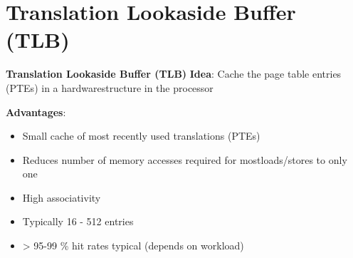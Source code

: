 \documentclass[11pt, table, aspectratio=169]{beamer}
\begin{document}
\section{\textbf{Translation Lookaside Buffer (TLB)}}

\begin{frame}{\textbf{Translation Lookaside Buffer (TLB)}}
 \textbf{Idea}: Cache the page table entries (PTEs) in a hardwarestructure in the processor
 
\vspace{0.4cm}
\textbf{Advantages}:
		\begin{itemize}
			\item Small cache of most recently used translations (PTEs)
			\item Reduces number of memory accesses required for mostloads/stores to only one
			\item High associativity
			\item Typically 16 - 512 entries
			\item > 95-99 \% hit rates typical (depends on workload)
		\end{itemize}
\end{frame}
%	
\end{document}
